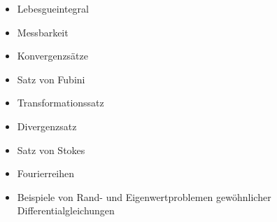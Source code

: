 \begin{module}
\begin{content}
\begin{itemize}\item Lebesgueintegral  \item Messbarkeit  \item Konvergenzsätze  \item Satz von Fubini  \item Transformationssatz  \item Divergenzsatz  \item Satz von Stokes  \item Fourierreihen  \item Beispiele von Rand- und Eigenwertproblemen gewöhnlicher Differentialgleichungen  \end{itemize}
\end{content}



\end{module}

